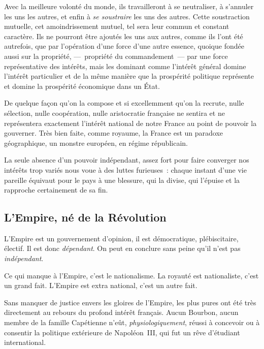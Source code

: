 \documentclass[french,twoside]{book} %
\newcommand{\astermono}{\medskip\centerline{\color{rubric}\large\selectfont{\syms ✻}}\medskip\par}%
\begin{document}
\astermono

\noindent Avec la meilleure volonté du monde, ils travailleront à se neutraliser, à s’annuler les uns les autres, et enfin à \emph{se soustraire} les uns des autres. Cette soustraction mutuelle, cet amoindrissement mutuel, tel sera leur commun et constant caractère. Ils ne pourront être ajoutés les uns aux autres, comme ils l’ont été autrefois, que par l’opération d’une force d’une autre essence, quoique fondée aussi sur la propriété, — propriété du commandement — par une force représentative des intérêts, mais les dominant comme l’intérêt général domine l’intérêt particulier et de la même manière que la prospérité politique représente et domine la prospérité économique dans un État.\par
De quelque façon qu’on la compose et si excellemment qu’on la recrute, nulle sélection, nulle coopération, nulle aristocratie française ne sentira et ne représentera exactement l’intérêt national de notre France au point de pouvoir la gouverner. Très bien faite, comme royaume, la France est un paradoxe géographique, un monstre européen, en régime républicain.\par
La seule absence d’un pouvoir indépendant, assez fort pour faire converger nos intérêts trop variés nous voue à des luttes furieuses : chaque instant d’une vie pareille équivaut pour le pays à une blessure, qui la divise, qui l’épuise et la rapproche certainement de sa fin.\par

\astermono

\subsection[{L’Empire, né de la Révolution}]{L’Empire, né de la Révolution}
\noindent L’Empire est un gouvernement d’opinion, il est démocratique, plébiscitaire, électif. Il est donc \emph{dépendant}. On peut en conclure sans peine qu’il n’est pas \emph{indépendant}.\par

\astermono

\noindent Ce qui manque à l’Empire, c’est le nationalisme. La royauté est nationaliste, c’est un grand fait. L’Empire est extra national, c’est un autre fait.\par

\astermono

\noindent Sans manquer de justice envers les gloires de l’Empire, les plus pures ont été très directement au rebours du profond intérêt français. Aucun Bourbon, aucun membre de la famille Capétienne n’eût, \emph{physiologiquement}, réussi à concevoir ou à consentir la politique extérieure de Napoléon III, qui fut un rêve d’étudiant international.\par
\end{document}
